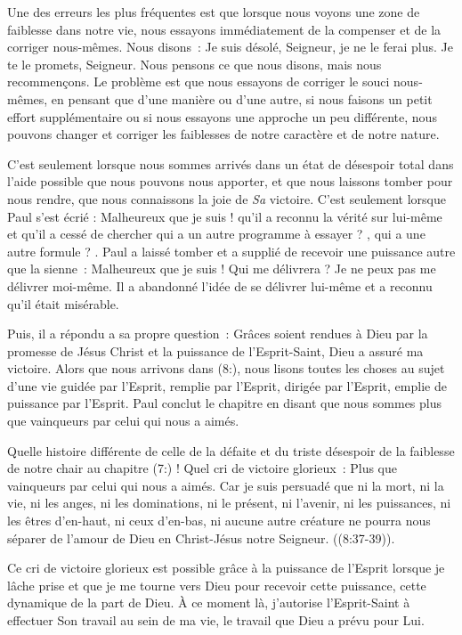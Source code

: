 Une des erreurs les plus fréquentes est que lorsque nous voyons une zone
 de faiblesse dans notre vie, nous essayons immédiatement de la compenser
 et de la corriger nous-mêmes. Nous disons~:
 \og Je suis désolé, Seigneur, je ne le ferai plus.
 Je te le promets, Seigneur. \fg{}
 Nous pensons ce que nous disons, mais nous recommençons.
 Le problème est que nous essayons de corriger le souci nous-mêmes,
 en pensant que d'une manière ou d'une autre, si nous faisons un petit effort
 supplémentaire ou si nous essayons une approche un peu différente,
 nous pouvons changer et corriger les faiblesses de notre caractère
 et de notre nature.

C'est seulement lorsque nous sommes arrivés dans un état de désespoir total
 dans l'aide possible que nous pouvons nous apporter, et que nous laissons
 tomber pour nous rendre, que nous connaissons la joie de \emph{Sa} victoire.
 C'est seulement lorsque Paul s'est écrié :
 \og Malheureux que je suis ! \fg{} qu'il a reconnu la vérité sur lui-même
 et qu'il a cessé de chercher \og qui a un autre programme à essayer ? \fg{},
 \og qui a une autre formule ? \fg{}.
 Paul a laissé tomber et a supplié de recevoir une puissance
 autre que la sienne~: \og Malheureux que je suis ! Qui me délivrera ?
 Je ne peux pas me délivrer moi-même. \fg{}
 Il a abandonné l'idée de se délivrer lui-même et a reconnu
 qu'il était misérable.

Puis, il a répondu a sa propre question~:
 \og Grâces soient rendues à Dieu par la promesse de Jésus Christ
 et la puissance de l'Esprit-Saint, Dieu a assuré ma victoire. \fg{}
 Alors que nous arrivons dans (8:),
 nous lisons toutes les choses au sujet d'une vie guidée par l'Esprit,
 remplie par l'Esprit, dirigée par l'Esprit, emplie de puissance par l'Esprit.
 Paul conclut le chapitre en disant que nous sommes \og plus que vainqueurs
 par celui qui nous a aimés. \fg{}

Quelle histoire différente de celle de la défaite et du triste désespoir
 de la faiblesse de notre chair au chapitre (7:) !
 Quel cri de victoire glorieux~:
 \og Plus que vainqueurs par celui qui nous a aimés.
 Car je suis persuadé que ni la mort, ni la vie, ni les anges,
 ni les dominations, ni le présent, ni l'avenir, ni les puissances,
 ni les êtres d'en-haut, ni ceux d'en-bas, ni aucune autre créature
 ne pourra nous séparer de l'amour de Dieu en Christ-Jésus
 notre Seigneur. \fg{} ((8:37-39)).

Ce cri de victoire glorieux est possible grâce à la puissance de l'Esprit
 lorsque je lâche prise et que je me tourne vers Dieu pour recevoir
 cette puissance, cette dynamique de la part de Dieu. À ce moment là,
 j'autorise l'Esprit-Saint à effectuer Son travail au sein de ma vie,
 le travail que Dieu a prévu pour Lui.


